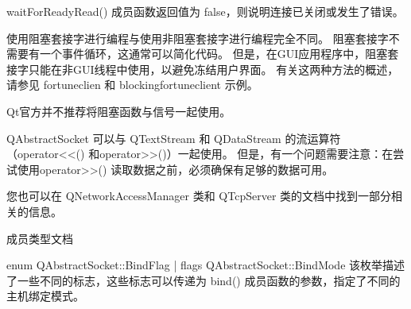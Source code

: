 waitForReadyRead() 成员函数返回值为 false，则说明连接已关闭或发生了错误。

使用阻塞套接字进行编程与使用非阻塞套接字进行编程完全不同。 阻塞套接字不需要有一个事件循环，这通常可以简化代码。 但是，在GUI应用程序中，阻塞套接字只能在非GUI线程中使用，以避免冻结用户界面。 有关这两种方法的概述，请参见 fortuneclien 和 blockingfortuneclient 示例。

\begin{notice}
Qt官方并不推荐将阻塞函数与信号一起使用。
\end{notice}


QAbstractSocket 可以与 QTextStream 和 QDataStream 的流运算符（operator<<() 和operator>>()）一起使用。 但是，有一个问题需要注意：在尝试使用operator>>() 读取数据之前，必须确保有足够的数据可用。

您也可以在 QNetworkAccessManager 类和 QTcpServer 类的文档中找到一部分相关的信息。

\splitLine

成员类型文档

enum QAbstractSocket::BindFlag | flags QAbstractSocket::BindMode
该枚举描述了一些不同的标志，这些标志可以传递为 bind() 成员函数的参数，指定了不同的主机绑定模式。

